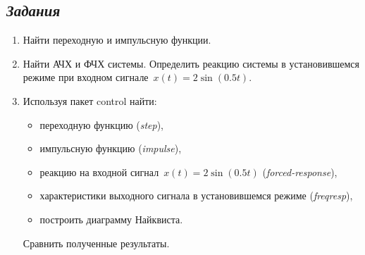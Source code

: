 \documentclass[a4paper,oneside,10pt]{book}
\theoremstyle{definition}
\begin{document}
\subsection*{\textit{Задания}}

\begin{enumerate}
	\item
	      Найти переходную и импульсную функции.
	\item \label{ordinary_eq}
	      Найти АЧХ и ФЧХ системы.
	      Определить реакцию системы в установившемся режиме при входном сигнале~$ x(t) = 2\sin(0.5t) $.

	\item
	      Используя пакет control найти:
	      \begin{itemize}
		      \item
		            переходную функцию (\textit{step}),
		      \item
		            импульсную функцию (\textit{impulse}),
		      \item
		            реакцию на входной сигнал~$ x(t) = 2\sin(0.5t) $ (\textit{forced-response}),
		      \item
		            характеристики выходного сигнала в установившемся режиме (\textit{freqresp}),
		      \item
		            построить диаграмму Найквиста.
	      \end{itemize}

	      Сравнить полученные результаты.
\end{enumerate}
\end{document}
